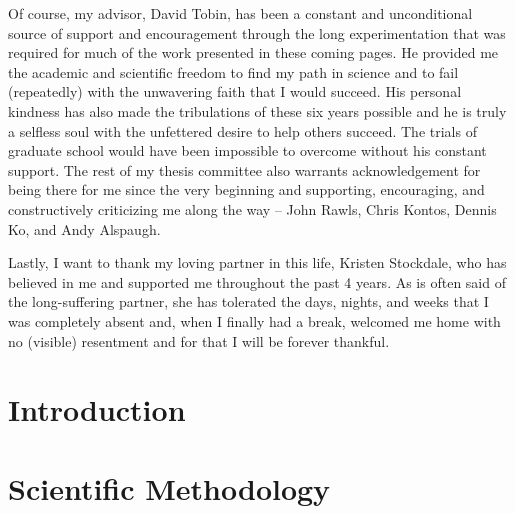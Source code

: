 \documentclass[PhD]{dukethesis2006}
\begin{document}
\begin{doublespace}
Of course, my advisor, David Tobin, has been a constant and unconditional source of support and encouragement through the long experimentation that was required for much of the work presented in these coming pages. He provided me the academic and scientific freedom to find my path in science and to fail (repeatedly) with the unwavering faith that I would succeed. His personal kindness has also made the tribulations of these six years possible and he is truly a selfless soul with the unfettered desire to help others succeed. The trials of graduate school would have been impossible to overcome without his constant support. The rest of my thesis committee also warrants acknowledgement for being there for me since the very beginning and supporting, encouraging, and constructively criticizing me along the way -- John Rawls, Chris Kontos, Dennis Ko, and Andy Alspaugh.

Lastly, I want to thank my loving partner in this life, Kristen Stockdale, who has believed in me and supported me throughout the past 4 years. As is often said of the long-suffering partner, she has tolerated the days, nights, and weeks that I was completely absent and, when I finally had a break, welcomed me home with no (visible) resentment and for that I will be forever thankful.

\end{doublespace}

\tableofcontents


\chapter{Introduction}\label{intro}

\begin{doublespace}

\end{doublespace}

\chapter{Scientific Methodology}\label{methods}

\begin{doublespace}

\end{doublespace}
\end{document}

